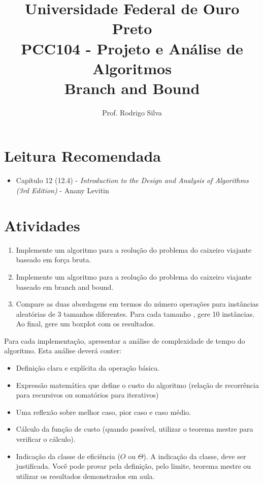 \documentclass{article}
\title{\vspace{-2 cm}Universidade Federal de Ouro Preto \\ PCC104 - Projeto e Análise de Algoritmos \\ Branch and Bound}
\author{Prof. Rodrigo Silva}
\begin{document}
\maketitle

\section*{Leitura Recomendada}

\begin{itemize}
    \item Capítulo 12 (12.4) - \textit{Introduction to the Design and Analysis of Algorithms (3rd Edition)} - Anany Levitin 
\end{itemize}


\section{Atividades}

\begin{enumerate}
    \item Implemente um algoritmo para a reolução do problema do caixeiro viajante baseado em força bruta.
    \item Implemente um algoritmo para a reolução do problema do caixeiro viajante baseado em branch and bound. 
    \item Compare as duas abordagens em termos do número operações para instâncias aleatórias de 3 tamanhos diferentes. Para cada tamanho , gere 10 instâncias. Ao final, gere um boxplot com os resultados.
\end{enumerate}

Para cada implementação, apresentar a análise de complexidade de tempo do algoritmo. Esta análise deverá conter:

\begin{itemize}
    \item Definição clara e explícita da operação básica.
    \item Expressão matemática que define o custo do algoritmo (relação de recorrência para recursivos ou somatórios para iterativos) 
    \item Uma reflexão sobre melhor caso, pior caso e caso médio.
    \item Cálculo da função de custo (quando possível, utilizar o teorema mestre para verificar o cálculo).
    \item Indicação da classe de eficiência ($O$ ou $\Theta$). A indicação da classe, deve ser justificada. Você pode provar pela definição, pelo limite, teorema mestre ou utilizar os resultados demonstrados em aula.
\end{itemize}

%
%
\end{document}
